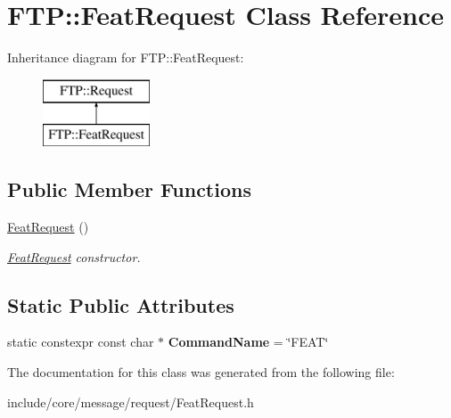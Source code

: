 \hypertarget{class_f_t_p_1_1_feat_request}{\section{F\-T\-P\-:\-:Feat\-Request Class Reference}
\label{class_f_t_p_1_1_feat_request}
}
Inheritance diagram for F\-T\-P\-:\-:Feat\-Request\-:\begin{figure}[H]
\begin{center}
\leavevmode
\includegraphics[height=2.000000cm]{class_f_t_p_1_1_feat_request}
\end{center}
\end{figure}
\subsection*{Public Member Functions}
\begin{DoxyCompactItemize}
\item 
\hypertarget{class_f_t_p_1_1_feat_request_a3f4a0e055a9fcacd680c8550f1410229}{\hyperlink{class_f_t_p_1_1_feat_request_a3f4a0e055a9fcacd680c8550f1410229}{Feat\-Request} ()}\label{class_f_t_p_1_1_feat_request_a3f4a0e055a9fcacd680c8550f1410229}

\begin{DoxyCompactList}\small\item\em \hyperlink{class_f_t_p_1_1_feat_request}{Feat\-Request} constructor. \end{DoxyCompactList}\end{DoxyCompactItemize}
\subsection*{Static Public Attributes}
\begin{DoxyCompactItemize}
\item 
\hypertarget{class_f_t_p_1_1_feat_request_aa42ff5dc78f3d80b1944ee80f0340017}{static constexpr const char $\ast$ {\bfseries Command\-Name} = \char`\"{}F\-E\-A\-T\char`\"{}}\label{class_f_t_p_1_1_feat_request_aa42ff5dc78f3d80b1944ee80f0340017}

\end{DoxyCompactItemize}


The documentation for this class was generated from the following file\-:\begin{DoxyCompactItemize}
\item 
include/core/message/request/Feat\-Request.\-h\end{DoxyCompactItemize}
